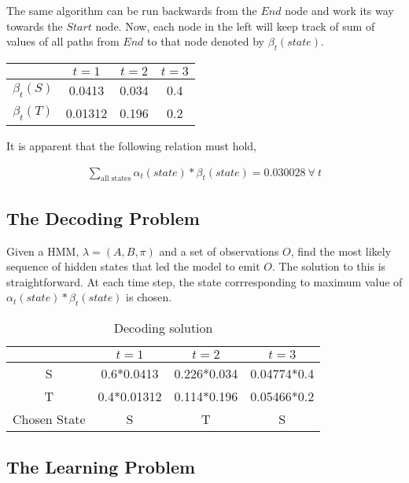\documentclass[11pt, a4paper]{article}
\begin{document}
The same algorithm can be run backwards from the $End$ node and work its way towards the $Start$ node. Now, each node in the left will keep track of sum of values of all paths from $End$ to that node denoted by $\beta_t(state)$.

\begin{table}[h!]
	\centering
	\begin{tabular}{c|c|c|c}
		\toprule
		             & $t=1$   & $t=2$ & $t=3$ \\
		\midrule
		$\beta_t(S)$ & 0.0413  & 0.034 & 0.4   \\
		$\beta_t(T)$ & 0.01312 & 0.196 & 0.2   \\
		\bottomrule
	\end{tabular}
\end{table}

It is apparent that the following relation must hold,

\begin{align*}
	\sum_{\text{all states}} \alpha_t(state)*\beta_t(state) = 0.030028\  \forall\ t 
\end{align*}
 
\subsection{The Decoding Problem}

Given a HMM, $\lambda = (A, B, \pi)$ and a set of observations $O$, find the most likely sequence of hidden states that led the model to emit $O
$. The solution to this is straightforward. At each time step, the state corrresponding to maximum value of $\alpha_t(state)*\beta_t(state)$ is chosen.

\begin{table}[h!]
	\centering
	\caption{Decoding solution}
	\label{tab:table2}
	\begin{tabular}{c|c|c|c}
		\toprule
		             & $t=1$       & $t=2$       & $t=3$       \\
		\midrule
		S            & 0.6*0.0413  & 0.226*0.034 & 0.04774*0.4 \\
		T            & 0.4*0.01312 & 0.114*0.196 & 0.05466*0.2 \\
		\midrule
		Chosen State & S           & T           & S           \\
		\bottomrule
	\end{tabular}
\end{table}

\subsection{The Learning Problem}
\end{document}
